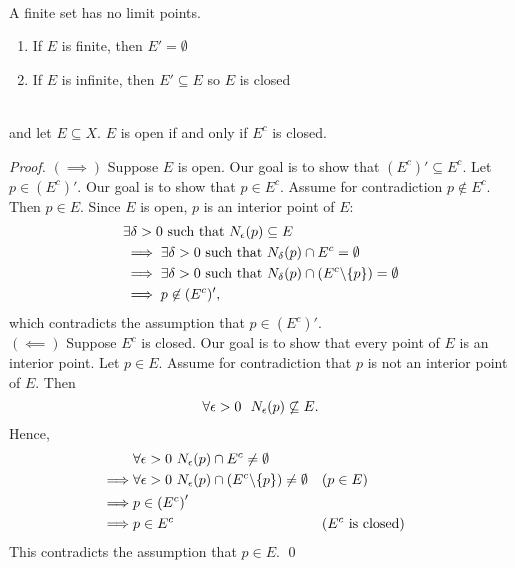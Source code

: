 \begin{corollary} \leavevmode \\
    A finite set has no limit points.
    \begin{enumerate} [$*)$]
        \item If $E$ is finite, then $E' = \emptyset$
        \item If $E$ is infinite, then $E' \subseteq E$ so $E$ is closed
    \end{enumerate}
\end{corollary}

\begin{theorem} \leavevmode \\
    \label{thm2.23}
    \routineMS and let $E\subseteq X.$ $E$ is open if and only if $E^c$ is closed.
\end{theorem}

\begin{proof}
    $(\implies)$ Suppose $E$ is open. Our goal is to show that $(E^c)' \subseteq E^c.$ Let $p \in (E^c)'$. Our goal is to show that $p \in E^c$. Assume for contradiction $p \not \in E^c.$ Then $p \in E.$ Since $E$ is open, $p$ is an interior point of $E$:
    \begin{align*}
        &\exists \delta > 0 \text{ such that } N_{\epsilon}(p) \subseteq E \\ 
        &\implies \exists \delta > 0 \text{ such that } N_{\delta}(p)\cap E^c = \emptyset \\
        &\implies \exists \delta > 0 \text{ such that } N_{\delta}(p) \cap \left(E^c \backslash \{p\}\right) = \emptyset \\
        &\implies p \not \in (E^c)',
    \end{align*}
    which contradicts the assumption that $p \in (E^c)'$. \\
    $(\impliedby)$ Suppose $E^c$ is closed. Our goal is to show that every point of $E$ is an interior point. Let $p \in E.$ Assume for contradiction that $p$ is not an interior point of $E$. Then
    $$\forall \epsilon > 0 ~~N_{\epsilon}(p) \not \subseteq E.$$
    Hence,
    \begin{align*}
        &\forall \epsilon > 0 ~N_{\epsilon}(p) \cap E^c \not = \emptyset \\
        \implies &\forall \epsilon > 0 ~N_{\epsilon}(p)\cap \left(E^c \backslash \{p\}\right) \not = \emptyset &&(p\in E) \\
        \implies &p \in \left(E^c\right)' \\
        \implies &p\in E^c &&(E^c \text{ is closed})
    \end{align*}
    This contradicts the assumption that $p\in E$.
    \qed
\end{proof}

